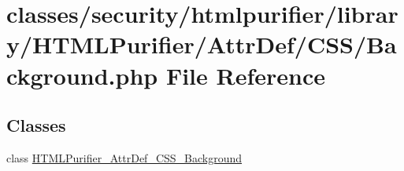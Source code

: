 \hypertarget{AttrDef_2CSS_2Background_8php}{\section{classes/security/htmlpurifier/library/\+H\+T\+M\+L\+Purifier/\+Attr\+Def/\+C\+S\+S/\+Background.php File Reference}
\label{AttrDef_2CSS_2Background_8php}
}
\subsection*{Classes}
\begin{DoxyCompactItemize}
\item 
class \hyperlink{classHTMLPurifier__AttrDef__CSS__Background}{H\+T\+M\+L\+Purifier\+\_\+\+Attr\+Def\+\_\+\+C\+S\+S\+\_\+\+Background}
\end{DoxyCompactItemize}
